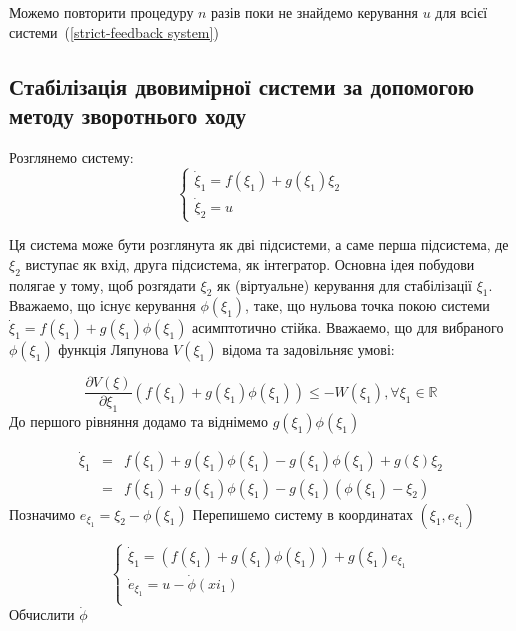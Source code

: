 \documentclass{article}
\begin{document}
Можемо повторити процедуру $n$ разів поки не знайдемо керування $u$ для всієї системи~(\ref{strict-feedback system})

\pagebreak



\subsection{Стабілізація двовимірної системи за допомогою методу зворотнього ходу}
Розглянемо систему:
\begin{equation}
	\begin{cases}
		\dot \xi_1 = f(\xi_1) + g(\xi_1)\xi_2 \\
		\dot\xi_2 = u
	\end{cases}
\end{equation}

Ця система може бути розглянута як дві підсистеми, а саме перша підсистема, де $\xi_2$ виступає як вхід, друга
підсистема, як інтегратор. Основна ідея побудови полягае у тому, щоб розгядати $\xi_2$ як (віртуальне) керування для
стабілізації $\xi_1$. Вважаемо, що існує керування $\phi(\xi_1)$, таке, що нульова точка покою
системи $\dot \xi_1 = f(\xi_1) + g(\xi_1)\phi(\xi_1)$
асимптотично стійка.
Вважаемо, що для вибраного $\phi(\xi_1)$ функція Ляпунова $V(\xi_1)$  відома та задовільняє умові:

\begin{equation}
    \frac{\partial V(\xi)}{\partial \xi_1}(f(\xi_1)+g(\xi_1)\phi(\xi_1)) \leq
    -W(\xi_1), \forall \xi_1 \in \mathbb{R}
\end{equation}
До першого рівняння додамо та віднімемо $g(\xi_1)\phi(\xi_1)$

\begin{eqnarray}
\dot\xi_1 &=& f(\xi_1)+g(\xi_1)\phi(\xi_1)-g(\xi_1)\phi(\xi_1)+g(\xi)\xi_2\\
&=&f(\xi_1)+g(\xi_1)\phi(\xi_1)-g(\xi_1)(\phi(\xi_1)-\xi_2)
\end{eqnarray}
Позначимо $e_{\xi_1} = \xi_2-\phi(\xi_1)$
Перепишемо систему в координатах $(\xi_1, e_{\xi_1})$

\begin{equation}
    \begin{cases}
    \dot \xi_1 = (f(\xi_1)+g(\xi_1)\phi(\xi_1))+g(\xi_1)e_{\xi_1}\\
    \dot e_{\xi_1} = u-\dot \phi(xi_1)\\  
    \end{cases}
\end{equation}
Обчислити $\dot\phi$ 
\end{document}
